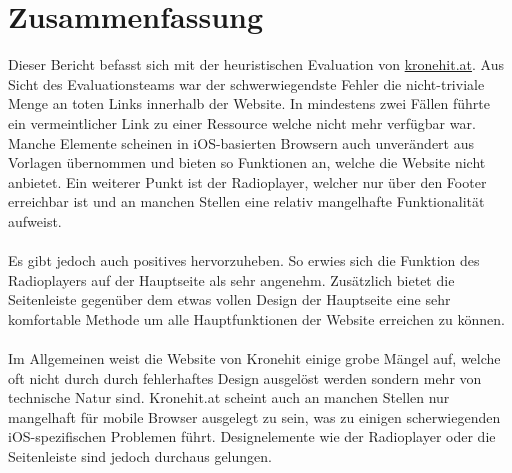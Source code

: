 \documentclass{article}
\begin{document}
	\section{Zusammenfassung}
	Dieser Bericht befasst sich mit der heuristischen Evaluation von \href{https://kronehit.at}{kronehit.at}. Aus Sicht des Evaluationsteams war der schwerwiegendste Fehler die nicht-triviale Menge an toten Links innerhalb der Website. In mindestens zwei Fällen führte ein vermeintlicher Link zu einer Ressource welche nicht mehr verfügbar war. Manche Elemente scheinen in iOS-basierten Browsern auch unverändert aus Vorlagen übernommen und bieten so Funktionen an, welche die Website nicht anbietet. Ein weiterer Punkt ist der Radioplayer, welcher nur über den Footer erreichbar ist und an manchen Stellen eine relativ mangelhafte Funktionalität aufweist. \\ \\
	Es gibt jedoch auch positives hervorzuheben. So erwies sich die Funktion des Radioplayers auf der Hauptseite als sehr angenehm. Zusätzlich bietet die Seitenleiste gegenüber dem etwas vollen Design der Hauptseite eine sehr komfortable Methode um alle Hauptfunktionen der Website erreichen zu können. \\ \\
	Im Allgemeinen weist die Website von Kronehit einige grobe Mängel auf, welche oft nicht durch durch fehlerhaftes Design ausgelöst werden sondern mehr von technische Natur sind. Kronehit.at scheint auch an manchen Stellen nur mangelhaft für mobile Browser ausgelegt zu sein, was zu einigen scherwiegenden iOS-spezifischen Problemen führt. Designelemente wie der Radioplayer oder die Seitenleiste sind jedoch durchaus gelungen.
\end{document}
